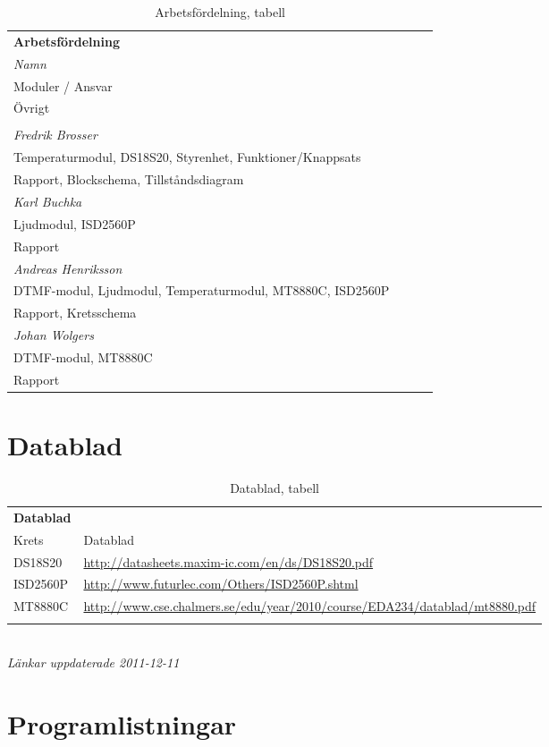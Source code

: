 \documentclass[a4paper,11pt]{article}
\begin{document}
	\begin{table} [H]
	\caption{Arbetsfördelning, tabell} 
	\label{tab:arbetsTabell}

		\begin{tabular}{l l l l}
		{\bf Arbetsfördelning}
		
		\\{\it Namn} \\ {Moduler / Ansvar} \\ {Övrigt}\\\\
		\hline
				{\it Fredrik Brosser}\\
				 Temperaturmodul, DS18S20, Styrenhet, Funktioner/Knappsats\\
				 Rapport, Blockschema, Tillståndsdiagram\\
				{\it Karl Buchka}\\
				 Ljudmodul, ISD2560P\\
				 Rapport\\
				{\it Andreas Henriksson}\\
				 DTMF-modul, Ljudmodul, Temperaturmodul, MT8880C, ISD2560P\\
				 Rapport, Kretsschema\\
				{\it Johan Wolgers}\\
				 DTMF-modul, MT8880C\\
				 Rapport\\
		\end{tabular}
	\end{table}
\pagebreak
	\section{Datablad}
	
	\label{sec:datablad}
	
	\begin{table} [H]
	\caption{Datablad, tabell} 
	\label{tab:databladsTabell}

		\begin{tabular}{l l}
		{\bf Datablad}
		\\{Krets} & {Datablad}\\
		\hline
			DS18S20 	& {\small \url{http://datasheets.maxim-ic.com/en/ds/DS18S20.pdf}}\\
			ISD2560P 	& {\small \url{http://www.futurlec.com/Others/ISD2560P.shtml}}\\
			MT8880C 	& {\small \url{http://www.cse.chalmers.se/edu/year/2010/course/EDA234/datablad/mt8880.pdf}}\\\\
		\end{tabular}
		\\{\it Länkar uppdaterade 2011-12-11}
	\end{table}

\pagebreak

	\section{Programlistningar}
	\label{sec:programlistningar}	
		
		
		
		
		
		
\end{document}
